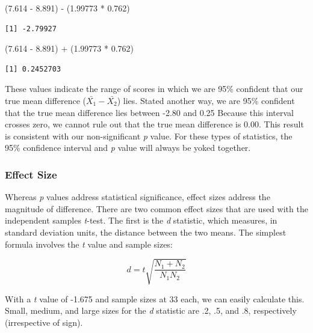 \documentclass[
  11pt,
]{book}
\newenvironment{Shaded}{\begin{snugshade}}{\end{snugshade}}
\newcommand{\FloatTok}[1]{\textcolor[rgb]{0.00,0.00,0.81}{#1}}
\newcommand{\NormalTok}[1]{#1}
\newcommand{\SpecialCharTok}[1]{\textcolor[rgb]{0.00,0.00,0.00}{#1}}
\begin{document}
\begin{Shaded}
\begin{Highlighting}[]
\NormalTok{(}\FloatTok{7.614} \SpecialCharTok{{-}} \FloatTok{8.891}\NormalTok{) }\SpecialCharTok{{-}}\NormalTok{ (}\FloatTok{1.99773} \SpecialCharTok{*} \FloatTok{0.762}\NormalTok{)}
\end{Highlighting}
\end{Shaded}

\begin{verbatim}
[1] -2.79927
\end{verbatim}

\begin{Shaded}
\begin{Highlighting}[]
\NormalTok{(}\FloatTok{7.614} \SpecialCharTok{{-}} \FloatTok{8.891}\NormalTok{) }\SpecialCharTok{+}\NormalTok{ (}\FloatTok{1.99773} \SpecialCharTok{*} \FloatTok{0.762}\NormalTok{)}
\end{Highlighting}
\end{Shaded}

\begin{verbatim}
[1] 0.2452703
\end{verbatim}

These values indicate the range of scores in which we are 95\% confident that our true mean difference (\(\bar{X_{1}}-\bar{X_{2}}\)) lies. Stated another way, we are 95\% confident that the true mean difference lies between -2.80 and 0.25 Because this interval crosses zero, we cannot rule out that the true mean difference is 0.00. This result is consistent with our non-significant \emph{p} value. For these types of statistics, the 95\% confidence interval and \emph{p} value will always be yoked together.

\hypertarget{effect-size-1}{%
\subsubsection{Effect Size}\label{effect-size-1}}

Whereas \emph{p} values address statistical significance, effect sizes address the magnitude of difference. There are two common effect sizes that are used with the independent samples \emph{t}-test. The first is the \emph{d} statistic, which measures, in standard deviation units, the distance between the two means. The simplest formula involves the \emph{t} value and sample sizes:

\[d = t\sqrt{\frac{N_{1}+N_{2}}{N_{1}N_{2}}}\]

With a \emph{t} value of -1.675 and sample sizes at 33 each, we can easily calculate this. Small, medium, and large sizes for the \emph{d} statistic are .2, .5, and .8, respectively (irrespective of sign).
\end{document}
